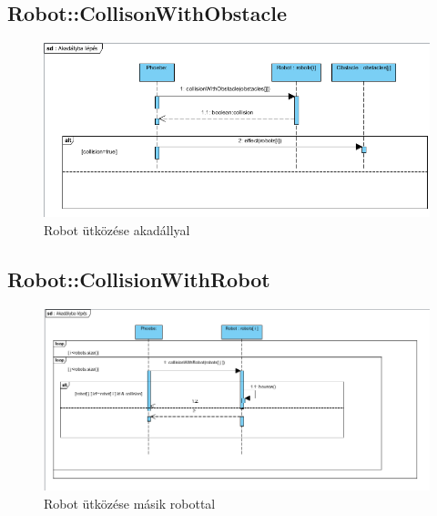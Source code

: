 \subsection{Robot::CollisonWithObstacle}
\begin{figure}[h]
\begin{center}
\includegraphics[width=17cm]{images/collisionWithObstacle()_sequence.PNG}
\caption{Robot ütközése akadállyal}
\label{fig:example4}
\end{center}
\end{figure}
\pagebreak

\subsection{Robot::CollisionWithRobot}
\begin{figure}[h]
\begin{center}
\includegraphics[width=17cm]{images/collisionWithRobot()_sequence.PNG}
\caption{Robot ütközése másik robottal}
\label{fig:example5}
\end{center}
\end{figure}
\pagebreak

